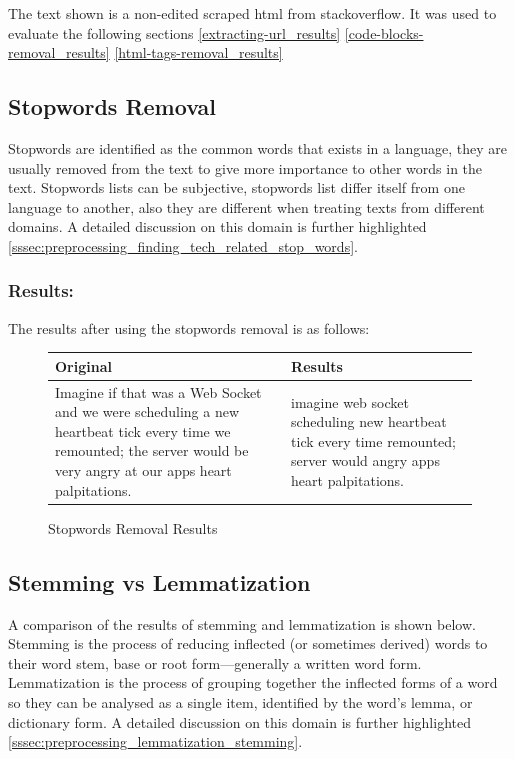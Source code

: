 \noindent The text shown is a non-edited scraped html from stackoverflow. It was used to evaluate the following sections \ref{extracting-url_results} \ref{code-blocks-removal_results} \ref{html-tags-removal_results}

\subsection{Stopwords Removal} \label{stopwords-removal_results}
Stopwords are identified as the common words that exists in a language, they are usually removed from the text to give more importance to other words in the text. Stopwords lists can be subjective, stopwords list differ itself from one language to another, also they are different when treating texts from different domains. A detailed discussion on this domain is further highlighted \ref{sssec:preprocessing_finding_tech_related_stop_words}.

\subsubsection{Results:} \label{stopwords-removal_results_results}
The results after using the stopwords removal is as follows:

\begin{figure}[H]
  \begin{center}
    \begin{tabular}{|p{9cm}|p{5cm}|}
    \hline\hline
    Original & Results \\ [0.5ex] %
    \hline 
    Imagine if that was a Web Socket and we were scheduling a new heartbeat tick every time we remounted; the server would be very angry at our apps heart palpitations. & imagine web socket scheduling new heartbeat tick every time remounted; server would angry apps heart palpitations.  \\ 
    \hline 
    \end{tabular}
  \end{center}
  \caption{Stopwords Removal Results}
  \label{fig:stopwords-removal_results}
\end{figure}

\hspace{1cm}

\subsection{Stemming vs Lemmatization} \label{stemming-vs-lemmatization_results}
A comparison of the results of stemming and lemmatization is shown below. Stemming is the process of reducing inflected (or sometimes derived) words to their word stem, base or root form—generally a written word form. Lemmatization is the process of grouping together the inflected forms of a word so they can be analysed as a single item, identified by the word's lemma, or dictionary form. A detailed discussion on this domain is further highlighted \ref{sssec:preprocessing_lemmatization_stemming}.

